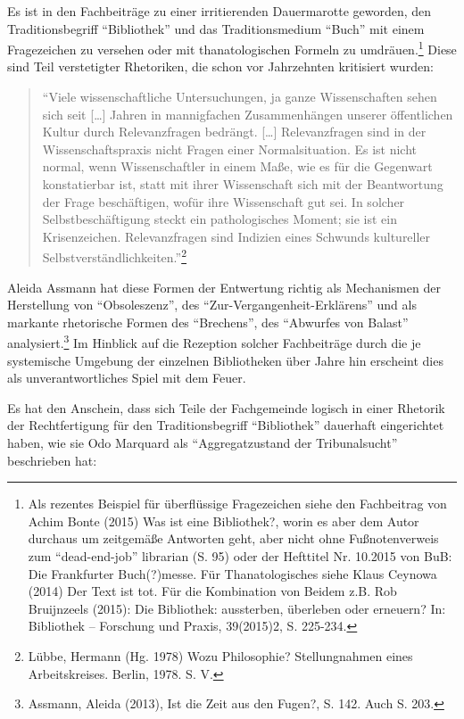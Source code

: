 \documentclass[a4paper,
fontsize=11pt,
oneside,
numbers=noperiodatend,
parskip=half-,
bibliography=totoc,
final
]{scrartcl}
\begin{document}
Es ist in den Fachbeiträge zu einer irritierenden Dauermarotte geworden,
den Traditionsbegriff \enquote{Bibliothek} und das Traditionsmedium
\enquote{Buch} mit einem Fragezeichen zu versehen oder mit
thanatologischen Formeln zu umdräuen.\footnote{Als rezentes Beispiel für
  überflüssige Fragezeichen siehe den Fachbeitrag von Achim Bonte (2015)
  Was ist eine Bibliothek?, worin es aber dem Autor durchaus um
  zeitgemäße Antworten geht, aber nicht ohne Fußnotenverweis zum
  \enquote{dead-end-job} librarian (S. 95) oder der Hefttitel Nr.
  10.2015 von BuB: Die Frankfurter Buch(?)messe. Für Thanatologisches
  siehe Klaus Ceynowa (2014) Der Text ist tot. Für die Kombination von
  Beidem z.B. Rob Bruijnzeels (2015): Die Bibliothek: aussterben,
  überleben oder erneuern? In: Bibliothek -- Forschung und Praxis,
  39(2015)2, S. 225-234.} Diese sind Teil verstetigter Rhetoriken, die
schon vor Jahrzehnten kritisiert wurden:

\begin{quote}
\enquote{Viele wissenschaftliche Untersuchungen, ja ganze Wissenschaften
sehen sich seit {[}\ldots{}{]} Jahren in mannigfachen Zusammenhängen
unserer öffentlichen Kultur durch Relevanzfragen bedrängt.
{[}\ldots{}{]} Relevanzfragen sind in der Wissenschaftspraxis nicht
Fragen einer Normalsituation. Es ist nicht normal, wenn Wissenschaftler
in einem Maße, wie es für die Gegenwart konstatierbar ist, statt mit
ihrer Wissenschaft sich mit der Beantwortung der Frage beschäftigen,
wofür ihre Wissenschaft gut sei. In solcher Selbstbeschäftigung steckt
ein pathologisches Moment; sie ist ein Krisenzeichen. Relevanzfragen
sind Indizien eines Schwunds kultureller
Selbstverständlichkeiten.}\footnote{Lübbe, Hermann (Hg. 1978) Wozu
  Philosophie? Stellungnahmen eines Arbeitskreises. Berlin, 1978. S. V.}
\end{quote}

Aleida Assmann hat diese Formen der Entwertung richtig als Mechanismen
der Herstellung von \enquote{Obsoleszenz}, des
\enquote{Zur-Vergangenheit-Erklärens} und als markante rhetorische
Formen des \enquote{Brechens}, des \enquote{Abwurfes von Balast}
analysiert.\footnote{Assmann, Aleida (2013), Ist die Zeit aus den
  Fugen?, S. 142. Auch S. 203.} Im Hinblick auf die Rezeption solcher
Fachbeiträge durch die je systemische Umgebung der einzelnen
Bibliotheken über Jahre hin erscheint dies als unverantwortliches Spiel
mit dem Feuer.

Es hat den Anschein, dass sich Teile der Fachgemeinde logisch in einer
Rhetorik der Rechtfertigung für den Traditionsbegriff
\enquote{Bibliothek} dauerhaft eingerichtet haben, wie sie Odo Marquard
als \enquote{Aggregatzustand der Tribunalsucht} beschrieben hat:
\end{document}
